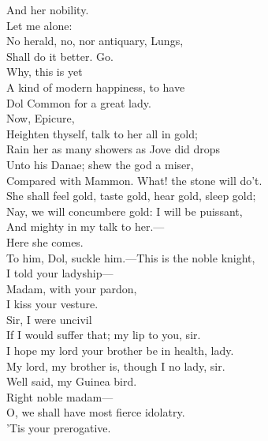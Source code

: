 \documentclass[a4paper,oneside]{memoir}
\begin{document}
\begin{drama*}
And her nobility.\\
\mammonspeaks {} Let me alone:\\
No herald, no, nor antiquary, Lungs,\\
Shall do it better. Go.\\
\facespeaks {}  Why, this is yet\\
A kind of modern happiness, to have\\
Dol Common for a great lady.\\
\mammonspeaks {} Now, Epicure,\\
Heighten thyself, talk to her all in gold;\\
Rain her as many showers as Jove did drops\\
Unto his Danae; shew the god a miser,\\
Compared with Mammon. What! the stone will do't.\\
She shall feel gold, taste gold, hear gold, sleep gold;\\
Nay, we will concumbere gold: I will be puissant,\\
And mighty in my talk to her.---\\
 Here she comes.\\
\facespeaks To him, Dol, suckle him.---This is the noble knight,\\
I told your ladyship---\\
\mammonspeaks {} Madam, with your pardon,\\
I kiss your vesture.\\
\dolspeaks {} Sir, I were uncivil\\
If I would suffer that; my lip to you, sir.\\
\mammonspeaks I hope my lord your brother be in health, lady.\\
\dolspeaks My lord, my brother is, though I no lady, sir.\\
\facespeaks {} Well said, my Guinea bird.\\
\mammonspeaks {} Right noble madam---\\
\facespeaks {} O, we shall have most fierce idolatry.\\
\mammonspeaks 'Tis your prerogative.\\

\end{drama*}
\end{document}
